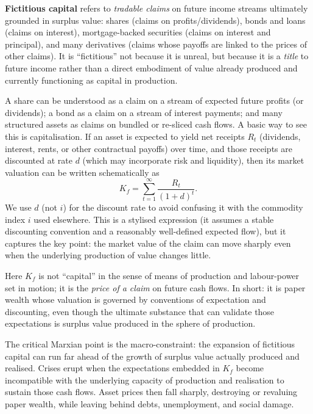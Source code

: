\textbf{Fictitious capital} refers to \emph{tradable claims} on future income streams
ultimately grounded in surplus value: shares (claims on profits/dividends), bonds and loans
(claims on interest), mortgage-backed securities (claims on interest and principal), and
many derivatives (claims whose payoffs are linked to the prices of other claims).
It is ``fictitious'' not because it is unreal, but because it is a \emph{title} to future
income rather than a direct embodiment of value already produced and currently functioning
as capital in production.\cite{HarveyNewImperialism}

A share can be understood as a claim on a stream of expected future profits (or dividends);
a bond as a claim on a stream of interest payments; and many structured assets as claims on
bundled or re-sliced cash flows. A basic way to see this is capitalisation. If an asset is
expected to yield net receipts $R_t$ (dividends, interest, rents, or other contractual payoffs)
over time, and those receipts are discounted at rate $d$ (which may incorporate risk and liquidity),
then its market valuation can be written schematically as
\begin{equation}
  K_f = \sum_{t=1}^{\infty} \frac{R_t}{(1+d)^t}.
  \label{eq:fictitious-capitalisation}
\end{equation}
We use $d$ (not $i$) for the discount rate to avoid confusing it with the commodity index $i$
used elsewhere. This is a stylised expression (it assumes a stable discounting convention and a
reasonably well-defined expected flow), but it captures the key point: the market value of the
claim can move sharply even when the underlying production of value changes little.

Here $K_f$ is not ``capital'' in the sense of means of production and labour-power set in motion;
it is the \emph{price of a claim} on future cash flows. In short: it is paper wealth whose valuation
is governed by conventions of expectation and discounting, even though the ultimate substance that can
validate those expectations is surplus value produced in the sphere of production.

The critical Marxian point is the macro-constraint: the expansion of fictitious capital can
run far ahead of the growth of surplus value actually produced and realised. Crises erupt when
the expectations embedded in $K_f$ become incompatible with the underlying capacity of production
and realisation to sustain those cash flows. Asset prices then fall sharply, destroying or
revaluing paper wealth, while leaving behind debts, unemployment, and social damage.

